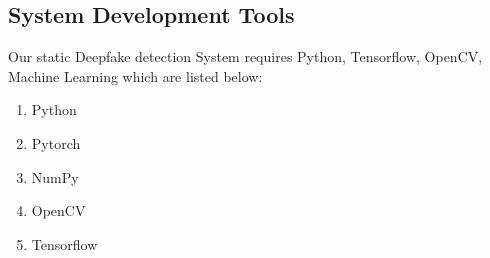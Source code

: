 \subsection{System Development Tools}
Our static Deepfake detection System requires Python, Tensorflow, OpenCV,
Machine Learning which are listed below:
\begin{enumerate}
    \item Python
    \item Pytorch
    \item NumPy
    \item OpenCV
    \item Tensorflow
\end{enumerate}
